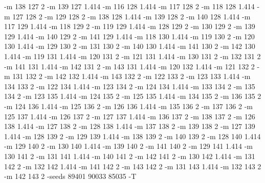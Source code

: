 \documentclass[12pt]{article}
\begin{document}
-m 138 127 2 -m 139 127 1.414 -m 116 128 1.414 -m 117 128 2 -m 118 128 1.414 -m 127 128 2 -m 129 128 2 -m 138 128 1.414 -m 139 128 2 -m 140 128 1.414 -m 117 129 1.414 -m 118 129 2 -m 119 129 1.414 -m 128 129 2 -m 130 129 2 -m 139 129 1.414 -m 140 129 2 -m 141 129 1.414 -m 118 130 1.414 -m 119 130 2 -m 120 130 1.414 -m 129 130 2 -m 131 130 2 -m 140 130 1.414 -m 141 130 2 -m 142 130 1.414 -m 119 131 1.414 -m 120 131 2 -m 121 131 1.414 -m 130 131 2 -m 132 131 2 -m 141 131 1.414 -m 142 131 2 -m 143 131 1.414 -m 120 132 1.414 -m 121 132 2 -m 131 132 2 -m 142 132 1.414 -m 143 132 2 -m 122 133 2 -m 123 133 1.414 -m 134 133 2 -m 122 134 1.414 -m 123 134 2 -m 124 134 1.414 -m 133 134 2 -m 135 134 2 -m 123 135 1.414 -m 124 135 2 -m 125 135 1.414 -m 134 135 2 -m 136 135 2 -m 124 136 1.414 -m 125 136 2 -m 126 136 1.414 -m 135 136 2 -m 137 136 2 -m 125 137 1.414 -m 126 137 2 -m 127 137 1.414 -m 136 137 2 -m 138 137 2 -m 126 138 1.414 -m 127 138 2 -m 128 138 1.414 -m 137 138 2 -m 139 138 2 -m 127 139 1.414 -m 128 139 2 -m 129 139 1.414 -m 138 139 2 -m 140 139 2 -m 128 140 1.414 -m 129 140 2 -m 130 140 1.414 -m 139 140 2 -m 141 140 2 -m 129 141 1.414 -m 130 141 2 -m 131 141 1.414 -m 140 141 2 -m 142 141 2 -m 130 142 1.414 -m 131 142 2 -m 132 142 1.414 -m 141 142 2 -m 143 142 2 -m 131 143 1.414 -m 132 143 2 -m 142 143 2 -seeds 89401 90033 85035 -T

\newpage
\end{document}
